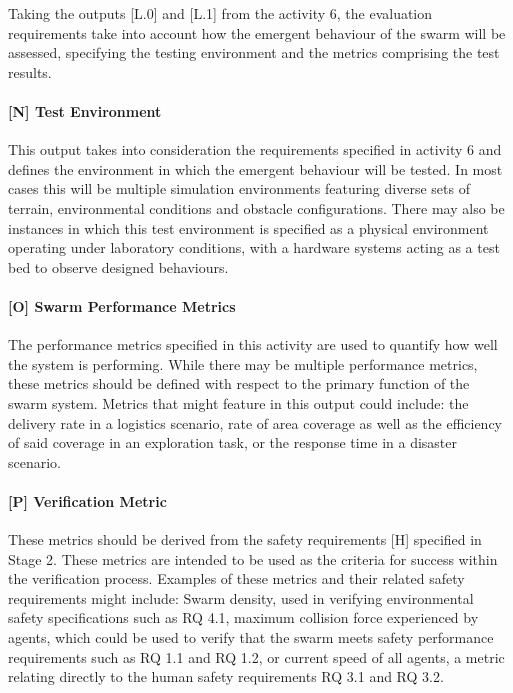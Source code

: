 \documentclass[lettersize,journal]{IEEEtran}
\begin{document}
Taking the outputs [L.0] and [L.1] from the activity 6, the evaluation requirements take into account how the emergent behaviour of the swarm will be assessed, specifying the testing environment and the metrics comprising the test results.  

\paragraph*{[N] Test Environment}

This output takes into consideration the requirements specified in activity 6 and defines the environment in which the emergent behaviour will be tested. In most cases this will be multiple simulation environments featuring diverse sets of terrain, environmental conditions and obstacle configurations. There may also be instances in which this test environment is specified as a physical environment operating under laboratory conditions, with a hardware systems acting as a test bed to observe designed behaviours.

\paragraph*{[O] Swarm Performance Metrics}

The performance metrics specified in this activity are used to quantify how well the system is performing. While there may be multiple performance metrics, these metrics should be defined with respect to the primary function of the swarm system. Metrics that might feature in this output could include: the delivery rate in a logistics scenario, rate of area coverage as well as the efficiency of said coverage in an exploration task, or the response time in a disaster scenario.

\paragraph*{[P] Verification Metric}

These metrics should be derived from the safety requirements [H] specified in Stage 2. These metrics are intended to be used as the criteria for success within the verification process. Examples of these metrics and their related safety requirements might include: Swarm density, used in verifying environmental safety specifications such as RQ 4.1, maximum collision force experienced by agents, which could be used to verify that the swarm meets safety performance requirements such as RQ 1.1 and RQ 1.2, or current speed of all agents, a metric relating directly to the human safety requirements RQ 3.1 and RQ 3.2.
\end{document}
